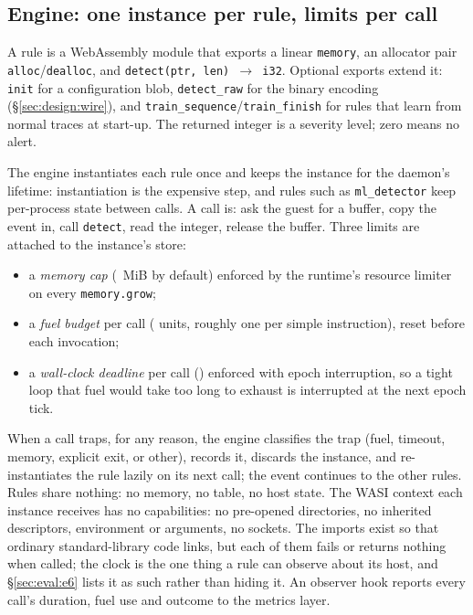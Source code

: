 \subsection{Engine: one instance per rule, limits per call}
\label{sec:design:engine}
A rule is a WebAssembly module that exports a linear \texttt{memory}, an
allocator pair \texttt{alloc}/\texttt{dealloc}, and \texttt{detect(ptr,
len) $\rightarrow$ i32}. Optional exports extend it: \texttt{init} for a
configuration blob, \texttt{detect\_raw} for the binary encoding
(\S\ref{sec:design:wire}), and \texttt{train\_sequence}/\texttt{train\_finish}
for rules that learn from normal traces at start-up. The returned integer
is a severity level; zero means no alert.

The engine instantiates each rule once and keeps the instance for the
daemon's lifetime: instantiation is the expensive step, and rules such as
\texttt{ml\_detector} keep per-process state between calls. A call is: ask
the guest for a buffer, copy the event in, call \texttt{detect}, read the
integer, release the buffer. Three limits are attached to the instance's
store:
\begin{itemize}
\item a \emph{memory cap} (\isoMemoryCapMiB{}~MiB by default) enforced by
  the runtime's resource limiter on every \texttt{memory.grow};
\item a \emph{fuel budget} per call (\isoFuel{} units, roughly one per
  simple instruction), reset before each invocation;
\item a \emph{wall-clock deadline} per call (\isoTimeout{}) enforced with
  epoch interruption, so a tight loop that fuel would take too long to
  exhaust is interrupted at the next epoch tick.
\end{itemize}
When a call traps, for any reason, the engine classifies the trap (fuel,
timeout, memory, explicit exit, or other), records it, discards the
instance, and re-instantiates the rule lazily on its next call; the event
continues to the other rules. Rules share nothing: no memory, no table, no
host state. The WASI context each instance receives has no capabilities:
no pre-opened directories, no inherited descriptors, environment or
arguments, no sockets. The imports exist so that ordinary standard-library
code links, but each of them fails or returns nothing when called; the
clock is the one thing a rule can observe about its host, and
\S\ref{sec:eval:e6} lists it as such rather than hiding it. An observer
hook reports every call's duration, fuel use and outcome to the metrics
layer.

